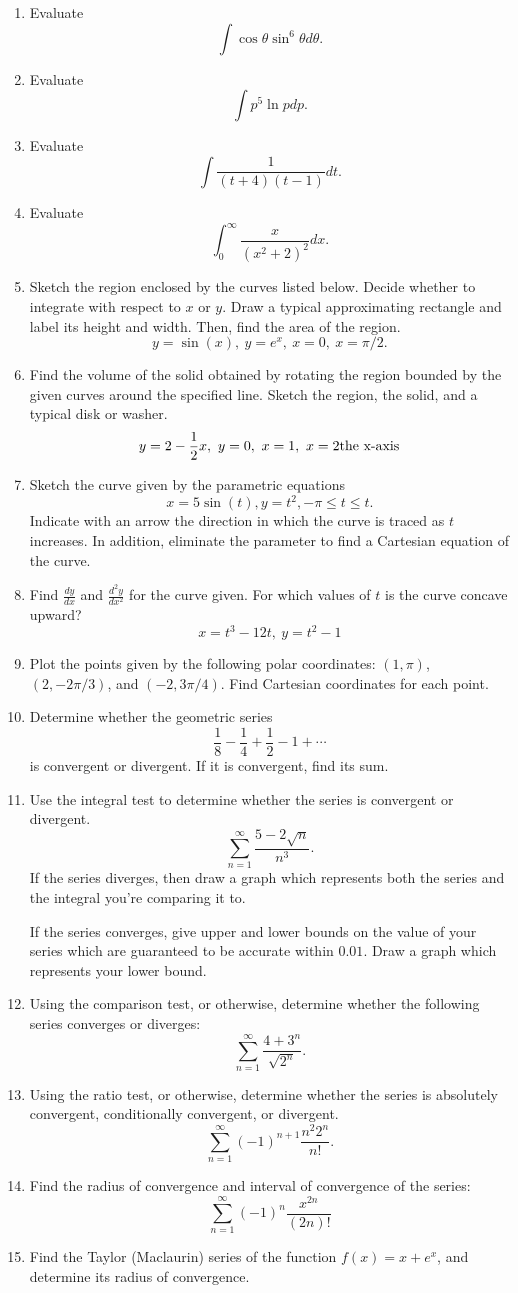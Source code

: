 \documentclass[12pt]{article}
\begin{document}
\begin{enumerate}[(1)]
\item
Evaluate
\[
\int \cos \theta \sin^6 \theta d\theta.
\]
\item
Evaluate
\[
\int p^5 \ln p dp.
\]
\item
Evaluate
\[
\int \frac{1}{(t + 4)(t - 1)} dt.
\]
\item
Evaluate
\[
\int_0^{\infty} \frac{x}{(x^2 + 2)^2} dx.
\]
\item
Sketch the region enclosed by the curves listed below. Decide whether to integrate with
respect to $x$ or $y$. Draw a typical approximating rectangle and label its height and width. Then,
find the area of the region.
\[
y = \sin(x), \ y = e^x, \ x = 0, \ x = \pi/2.
\]
\item
Find the volume of the solid obtained by rotating the region bounded by the given curves
around the specified line. Sketch the region, the solid, and a typical disk or washer.
\[
y = 2 - \frac{1}{2} x, \ y = 0, \ x = 1, \ x = 2 \textnormal{the x-axis}
\]
\item
Sketch the curve given by the parametric equations
\[
x = 5 \sin(t), y = t^2, - \pi \leq t \leq t.
\]
Indicate with an arrow the direction in which the curve is traced as $t$ increases.
In addition, eliminate the parameter to find a Cartesian equation of the curve.
\item
Find $\frac{dy}{dx}$ and $\frac{d^2 y}{dx^2}$ for the curve given. For which values of $t$ is
the curve concave upward?
\[
x = t^3 - 12t, \ y = t^2 - 1
\]
\item
Plot the points given by the following polar coordinates: $(1, \pi)$, $(2, -2\pi/3)$, and $(-2, 3 \pi/4)$.
Find Cartesian coordinates for each point.
\item
Determine whether the geometric series
\[
\frac{1}{8} - \frac{1}{4} + \frac{1}{2} - 1 + \cdots
\]
is convergent or divergent. If it is convergent, find its sum.
\item
Use the integral test to determine whether the series is convergent or divergent.
\[
\sum_{n = 1}^{\infty} \frac{5 - 2 \sqrt{n}}{n^3}.
\]
If the series diverges, then draw a graph which
represents both the series and the integral you’re comparing it to.

If the series converges, give upper and lower bounds on the value of your series
which are guaranteed to be accurate within $0.01$. Draw a graph which represents your
lower bound.
\item
Using the comparison test, or otherwise, determine whether the following series converges or diverges:
\[
\sum_{n = 1}^{\infty} \frac{4 + 3^n}{\sqrt{2^n}}.
\]
\item
Using the ratio test, or otherwise, determine whether the series is absolutely convergent, conditionally
convergent, or divergent.
\[
\sum_{n = 1}^{\infty} (-1)^{n + 1} \frac{ n^2 2^n }{n!}.
\]
\item
Find the radius of convergence and interval of convergence of the series:
\[
\sum_{n = 1}^{\infty} (-1)^n \frac{x^{2n} }{(2n)!}
\]
\item
Find the Taylor (Maclaurin) series of the function $f(x) = x + e^x$, and determine its
radius of convergence.

\end{enumerate}
\end{document}
